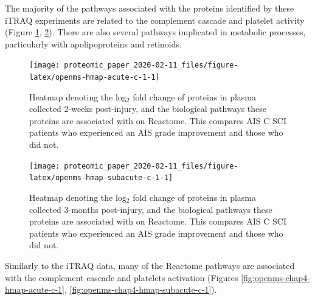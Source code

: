 \documentclass[
]{article}
\newcommand{\blandscape}{\begin{landscape}}
\newcommand{\elandscape}{\end{landscape}}
\begin{document}
The majority of the pathways associated with the proteins identified by these iTRAQ experiments are related to the complement cascade and platelet activity (Figure \ref{fig:openms-hmap-acute-c-1}, \ref{fig:openms-hmap-subacute-c-1}).
There are also several pathways implicated in metabolic processes, particularly with apolipoproteins and retinoids.

\clearpage
\blandscape



\begin{figure}

{\centering \texttt{[image: proteomic\_paper\_2020-02-11\_files/figure-latex/openms-hmap-acute-c-1-1]} 

}

\caption{Heatmap denoting the log\(_2\) fold change of proteins in plasma collected 2-weeks post-injury, and the biological pathways these proteins are associated with on Reactome. This compares AIS C SCI patients who experienced an AIS grade improvement and those who did not.}\label{fig:openms-hmap-acute-c-1}
\end{figure}

\elandscape
\blandscape



\begin{figure}

{\centering \texttt{[image: proteomic\_paper\_2020-02-11\_files/figure-latex/openms-hmap-subacute-c-1-1]} 

}

\caption{Heatmap denoting the log\(_2\) fold change of proteins in plasma collected 3-months post-injury, and the biological pathways these proteins are associated with on Reactome. This compares AIS C SCI patients who experienced an AIS grade improvement and those who did not.}\label{fig:openms-hmap-subacute-c-1}
\end{figure}

\elandscape
\clearpage

Similarly to the iTRAQ data, many of the Reactome pathways are associated with the complement cascade and platelets activation (Figures \ref{fig:openms-chap4-hmap-acute-c-1}, \ref{fig:openms-chap4-hmap-subacute-c-1}).
\end{document}

